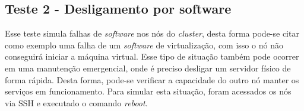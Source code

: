 % 


\subsection{Teste 2 - Desligamento por software}

Esse teste simula falhas de \textit{software} nos nós do \textit{cluster}, desta forma pode-se citar como exemplo uma falha de um \textit{software} 
de virtualização, com isso o nó não conseguirá iniciar a máquina virtual. Esse tipo de situação também pode ocorrer em uma manutenção emergencial, 
onde é preciso desligar um servidor físico de forma rápida. Desta forma, pode-se verificar a capacidade do outro nó manter os serviços
em funcionamento. Para simular esta situação, foram acessados os nós via \ac{SSH} e executado o comando \textit{reboot}.


